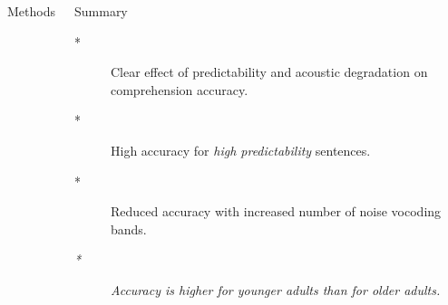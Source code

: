 \documentclass[final,12pt]{beamer}
\begin{document}
\begin{frame}[t]
\begin{columns}[t]
\begin{block}{Methods}
\end{block}


\vspace{0.9em}

\begin{block}{Summary}
    \begin{description}
        \item[\tiny{*}]Clear effect of predictability and acoustic degradation on comprehension accuracy.
            \vspace{0.3em}
        \item[\tiny{*}]High accuracy for \textit{high predictability} sentences.
            \vspace{0.3em}
        \item[\tiny{*}]Reduced accuracy with increased number of noise vocoding bands.
        \item[\textit{\tiny{*}}] \textit{Accuracy is higher for younger adults than for older adults.}
    \end{description}
\end{block}



\end{columns} 

\end{frame}
\end{document}
